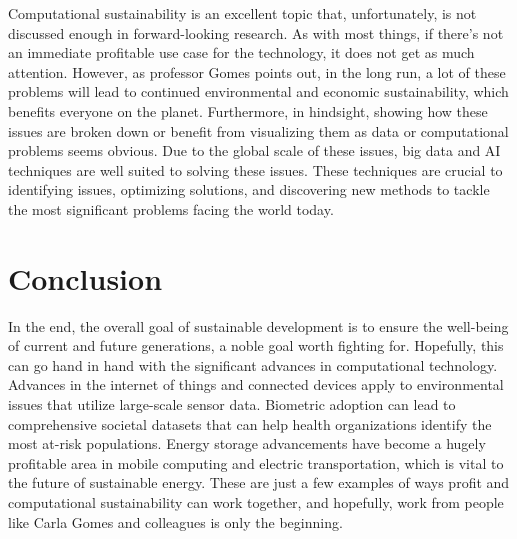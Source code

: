 \documentclass[journal,onecolumn]{IEEEtran}
\begin{document}
Computational sustainability is an excellent topic that, unfortunately, is not discussed enough in forward-looking research. As with most things, if there's not an immediate profitable use case for the technology, it does not get as much attention. 
However, as professor Gomes points out, in the long run, a lot of these problems will lead to continued environmental and economic sustainability, which benefits everyone on the planet. 
Furthermore, in hindsight, showing how these issues are broken down or benefit from visualizing them as data or computational problems seems obvious. 
Due to the global scale of these issues, big data and AI techniques are well suited to solving these issues. 
These techniques are crucial to identifying issues, optimizing solutions, and discovering new methods to tackle the most significant problems facing the world today. 

\section{Conclusion}

In the end, the overall goal of sustainable development is to ensure the well-being of current and future generations, a noble goal worth fighting for.
Hopefully, this can go hand in hand with the significant advances in computational technology. 
Advances in the internet of things and connected devices apply to environmental issues that utilize large-scale sensor data. 
Biometric adoption can lead to comprehensive societal datasets that can help health organizations identify the most at-risk populations. 
Energy storage advancements have become a hugely profitable area in mobile computing and electric transportation, which is vital to the future of sustainable energy. 
These are just a few examples of ways profit and computational sustainability can work together, and hopefully, work from people like Carla Gomes and colleagues is only the beginning. 


\end{document}
